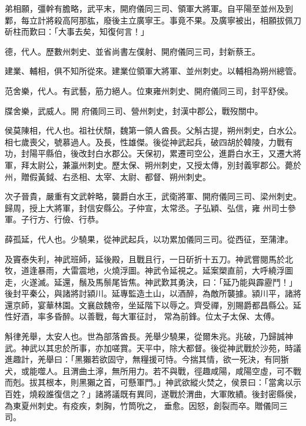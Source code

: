 \begin{pinyinscope}
 弟相願，彊幹有膽略，武平末，開府儀同三司、領軍大將軍。自平陽至並州及到鄴，每立計將殺高阿那肱，廢後主立廣寧王。事竟不果。及廣寧被出，相願拔佩刀斫柱而歎曰：「大事去矣，知復何言！」



 德，代人。歷數州刺史、並省尚書左僕射、開府儀同三司，封新蔡王。



 建業、輔相，俱不知所從來。建業位領軍大將軍、並州刺史。以輔相為朔州總管。



 范舍樂，代人。有武藝，筋力絕人。位東雍州刺史、開府儀同三司，封平舒侯。



 牒舍樂，武威人。開
 府儀同三司、營州刺史，封漢中郡公，戰歿關中。



 侯莫陳相，代人也。祖社伏頹，魏第一領人酋長。父斛古提，朔州刺史，白水公。相七歲喪父，號慕過人。及長，性雄傑。後從神武起兵，破四胡於韓陵，力戰有功，封陽平縣伯，後改封白水郡公。天保初，累遷司空公，進爵白水王，又遷大將軍，拜太尉公，兼瀛州刺史。歷太保、朔州刺史，又授太傳，別封義寧郡公。薨於州，贈假黃鉞、右丞相、太宰、太尉、都督、朔州刺史。



 次子晉貴，嚴重有文武幹略，襲爵白水王，武衛將軍、開府儀同三司、梁州刺史。歸周，授上大將軍，封信安縣公。子仲宣，太常丞。子弘穎、弘信，雍
 州司士參軍。子行方、行儉、行恭。



 薛孤延，代人也。少驍果，從神武起兵，以功累加儀同三司。從西征，至蒲津。



 及竇泰失利，神武班師，延後殿，且戰且行，一日斫折十五刀。神武嘗閱馬於北牧，道逢暴雨，大雷震地，火燒浮圖。神武令延視之。延案槊直前，大呼繞浮圖走，火遂滅。延還，鬚及馬鬃尾皆焦。神武歎其勇決，曰：「延乃能與霹靂鬥！」後封平秦公，與諸將討潁川。延專監造土山，以酒醉，為敵所襲據。潁川平，諸將還京師，宴華林園。文襄啟魏帝，坐延階下以辱之。齊受禪，別賜爵都昌縣公。延性好酒，率多昏醉。以善戰，每大軍征討，
 常為前鋒。位太子太保、太傅。



 斛律羌舉，太安人也。世為部落酋長。羌舉少驍果，從爾朱兆。兆破，乃歸誠神武。神武以其忠於所事，亦加嗟賞。天平中，除大都督。後從神武戰於沙苑，時議進趣計，羌舉曰：「黑獺若欲固守，無糧援可恃。今揣其情，欲一死決，有同狾犬，或能噬人。且渭曲土濘，無所用力。若不與戰，徑趣咸陽，咸陽空虛，可不戰而剋。拔其根本，則黑獺之首，可懸軍門。」神武欲縱火焚之，侯景曰：「當禽以示百姓，燒殺誰復信之？」諸將議既有異同，遂戰於渭曲，大軍敗績。後封密縣侯，為東夏州刺史。有疫疾，刺胸，竹筒吮之，
 垂愈。因怒，創裂而卒。贈儀同三司。




\end{pinyinscope}
